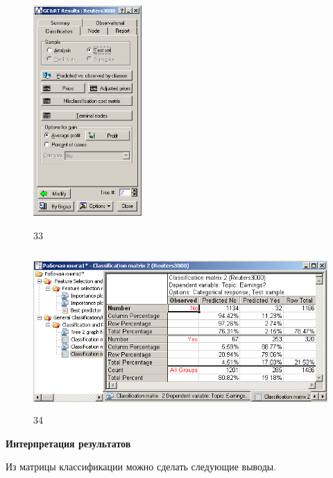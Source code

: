\begin{figure}[!h]
  \centering

  \begin{minipage}{0.29\textwidth}
    \centering

    \includegraphics[height=8cm]
    {inc/33.PNG}

    \caption{33}

    \label{fig:33}
  \end{minipage}
  \begin{minipage}{0.69\textwidth}
    \centering

    \includegraphics[height=6cm]
    {inc/34.PNG}

    \caption{34}

    \label{fig:34}
  \end{minipage}
\end{figure}

\newpage

\begin{center}
  \textbf{Интерпретация результатов}
\end{center}

Из матрицы классификации можно сделать следующие выводы.

